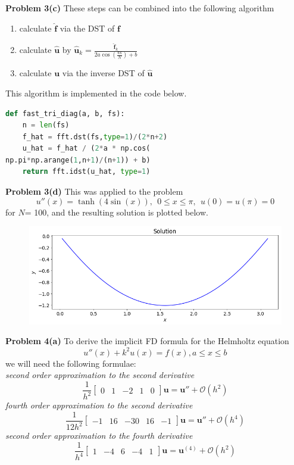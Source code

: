 \documentclass[12pt]{article}
\newcommand{\problem}[1]{\hspace{-4 ex} \large \textbf{Problem #1} }
\newcommand{\bigO}{\mathcal{O}}
\renewcommand{\vec}[1]{\boldsymbol{\mathbf{#1}}}
\begin{document}
\bigbreak
\problem{3(c)} These steps can be combined into the following algorithm
\begin{enumerate}
	\item calculate $\hat{\vec{f}}$ via the DST of $\vec{f}$
	\item calculate $\hat{\vec{u}}$ by $\hat{\vec{u}}_k = \frac{\hat{\vec{f}}_k}{2a \cos \left(\frac{\pi k}{N} \right) + b}$
	\item calculate $\vec{u}$ via the inverse DST of $\hat{\vec{u}}$
\end{enumerate}
This algorithm is implemented in the code below.
\begin{lstlisting}[language=Python]
def fast_tri_diag(a, b, fs):
	n = len(fs)
	f_hat = fft.dst(fs,type=1)/(2*n+2)
	u_hat = f_hat / (2*a * np.cos(
np.pi*np.arange(1,n+1)/(n+1)) + b)
	return fft.idst(u_hat, type=1)
\end{lstlisting}

\bigbreak

\problem{3(d)} This was applied to the problem
$$
u''(x) = \tanh(4\sin(x)), \ \ 0 \leq x \leq \pi, \ \  u(0)=u(\pi) = 0
$$
for $N$= 100, and the resulting solution is plotted below.
\begin{figure}[H]
	\includegraphics[width=1\textwidth]{hw02_p3d_plot}
	\centering
\end{figure}



\bigbreak

\problem{4(a)} To derive the implicit FD formula for the Helmholtz equation
$$
u''(x) + k^2 u(x) = f(x), a\leq x \leq b
$$
we will need the following formulae: \\
\textit{second order approximation to the second derivative}
$$
\frac{1}{h^2}\begin{bmatrix} 0 & 1 & -2 & 1 & 0 \end{bmatrix}\vec{u} = \vec{u}'' + \bigO(h^2)
$$
\textit{fourth order approximation to the second derivative}
$$
\frac{1}{12h^2}\begin{bmatrix} -1 & 16 & -30 & 16 & -1 \end{bmatrix}\vec{u} = \vec{u}'' + \bigO(h^4)
$$
\textit{second order approximation to the fourth derivative}
$$
\frac{1}{h^4}\begin{bmatrix} 1 & -4 & 6 & -4 & 1 \end{bmatrix}\vec{u} = \vec{u}^{(4)} + \bigO(h^2) 
$$
\end{document}
